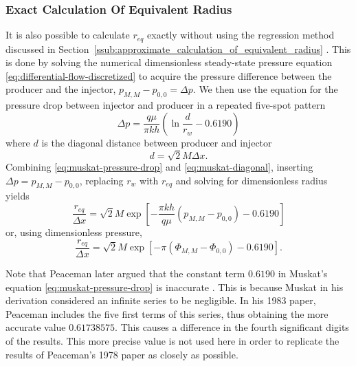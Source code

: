 \subsubsection{Exact Calculation Of Equivalent Radius} %
\label{ssub:exact_calculation_of_equivalent_radius}
It is also possible to calculate $r_{eq}$ exactly without using the regression method discussed in Section~\ref{ssub:approximate_calculation_of_equivalent_radius} \cite{Peaceman1978Interpretation}. This is done by solving the numerical dimensionless steady-state pressure equation \eqref{eq:differential-flow-discretized} to acquire the pressure difference between the producer and the injector, $p_{M,M}-p_{0,0}=\Delta p$. We then use the equation for the pressure drop between injector and producer in a repeated five-spot pattern \cite{Muskat1946Flow}
\begin{equation}
    \label{eq:muskat-pressure-drop}
    \Delta p = \frac{q\mu}{\pi k h} \left( \ln \frac{d}{r_w} - 0.6190 \right)
\end{equation}
where $d$ is the diagonal distance between producer and injector
\begin{equation}
    \label{eq:muskat-diagonal}
    d = \sqrt{2} M \Delta x.
\end{equation}
Combining \eqref{eq:muskat-pressure-drop} and \eqref{eq:muskat-diagonal}, inserting $\Delta p = p_{M,M} - p_{0,0}$, replacing $r_w$ with $r_{eq}$ and solving for dimensionless radius yields
\begin{equation}
    \label{eq:peaceman77-eqrad-exact}
    \frac{r_{eq}}{\Delta x} = \sqrt{2}M \exp\left[- \frac{\pi k h}{q\mu} \left( p_{M,M} - p_{0,0} \right) - 0.6190 \right]
\end{equation}
or, using dimensionless pressure,
\begin{equation}
    \label{eq:peaceman77-eqrad-exact-dimensionless}
    \frac{r_{eq}}{\Delta x} = \sqrt{2}M \exp\left[- \pi \left( \Phi_{M,M} - \Phi_{0,0} \right) - 0.6190 \right].
\end{equation}

Note that Peaceman later argued that the constant term $0.6190$ in Muskat's equation \eqref{eq:muskat-pressure-drop} is inaccurate \cite{Peaceman1983Interpretation}. This is because Muskat in his derivation considered an infinite series to be negligible. In his 1983 paper, Peaceman includes the five first terms of this series, thus obtaining the more accurate value $0.61738575$. This causes a difference in the fourth significant digits of the results. This more precise value is not used here in order to replicate the results of Peaceman's 1978 paper as closely as possible.




